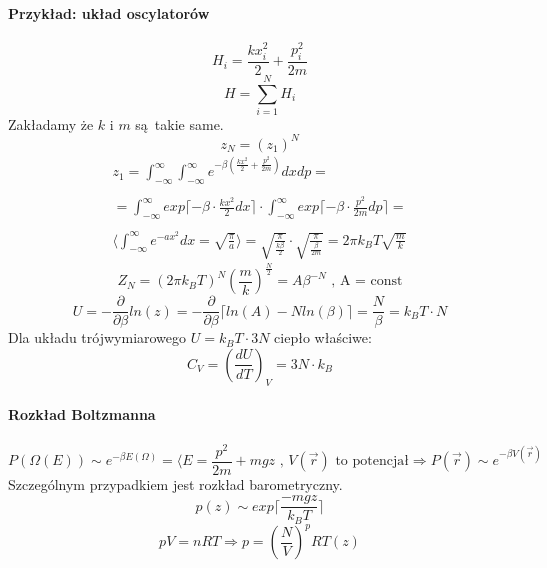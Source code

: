 \documentclass{article}
\begin{document}
		\paragraph{Przykład: układ oscylatorów}
		\begin{equation}
		H_i = \frac{kx_i^2}{2} + \frac{p_i^2}{2m}
		\end{equation}
		\begin{equation}
		H = \sum_{i=1}^{N}H_i
		\end{equation}
		Zakładamy że $ k $ i $ m $ są takie same.
		\begin{equation}
		z_N = (z_1)^N
		\end{equation}
		\begin{equation}
		\begin{array}{cc}
			z_1 = \int_{- \infty}^{\infty} \int_{- \infty}^{\infty} 
			e^{-\beta(\frac{kx^2}{2} + \frac{p^2}{2m})}dxdp = \\ \\
			= \int_{- \infty}^{\infty}exp\lceil -\beta \cdot \frac{kx^2}{2}dx \rceil \cdot
			\int_{- \infty}^{\infty}exp\lceil -\beta \cdot  \frac{p^2}{2m}dp \rceil = \\ \\
			\langle \int_{- \infty}^{\infty} e^{-ax^2}dx = \sqrt{\frac{\pi}{a}} \rangle =
			\sqrt{\frac{\pi}{\frac{k\beta}{2}}} \cdot \sqrt{\frac{\pi}{\frac{\beta}{2m}}} = 
			2\pi k_B T\sqrt{\frac{m}{k}}
		\end{array}
		\end{equation}
		\begin{equation}
		Z_N = (2\pi k_B T)^N(\frac{m}{k})^{\frac{N}{2}} = A\beta^{-N} \text{ , A = const} 
		\end{equation}
		\begin{equation}
		U = -\frac{\partial}{\partial \beta}ln(z) = -\frac{\partial}{\partial \beta} 
		\lceil ln(A) - Nln(\beta) \rceil = \frac{N}{\beta} = k_BT \cdot N 
		\end{equation}
		Dla układu trójwymiarowego $ U = k_BT \cdot 3N $ ciepło właściwe: 
		\begin{equation}
		C_V = (\frac{dU}{dT})_V = 3N\cdot k_B
		\end{equation}		
		\paragraph{Rozkład Boltzmanna}
		\begin{equation}
		P(\Omega(E)) \sim e^{-\beta E(\Omega)} = \langle E = \frac{p^2}{2m} + mgz 
		\text{ , } V(\vec{r}) \text{ to potencjał} \Rightarrow
		P(\vec{r}) \sim e^{-\beta V(\vec{r})}	
		\end{equation}
		Szczególnym przypadkiem jest rozkład barometryczny.
		\begin{equation}
		p(z) \sim exp \lceil \frac{-mgz}{k_BT} \rceil
		\end{equation}
		\begin{equation}
		pV = nRT \Rightarrow p = (\frac{N}{V})^pRT(z)
		\end{equation}
\end{document}
